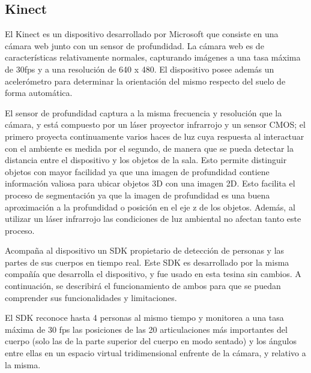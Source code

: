 
\subsection{Kinect}

El Kinect es un dispositivo desarrollado por Microsoft que consiste en una cámara web junto con un sensor de profundidad. La cámara web es de características relativamente normales, capturando imágenes a una tasa máxima de 30fps y a una resolución de 640 x 480. El dispositivo posee además un acelerómetro para determinar la orientación del mismo respecto del suelo de forma automática.


El sensor de profundidad captura a la misma frecuencia y resolución que la cámara, y está compuesto por un láser proyector infrarrojo y un sensor CMOS; el primero proyecta continuamente varios haces de luz cuya respuesta al interactuar con el ambiente es medida por el segundo, de manera que se pueda detectar la distancia entre el dispositivo y los objetos de la sala. Esto permite distinguir objetos con mayor facilidad ya que una imagen de profundidad contiene información valiosa para ubicar objetos 3D con una imagen 2D. Esto facilita el proceso de segmentación ya que la imagen de profundidad es una buena aproximación a la profundidad o posición en el eje z de los objetos. Además, al utilizar un láser infrarrojo las condiciones de luz ambiental no afectan tanto este proceso. 



Acompaña al dispositivo un SDK propietario de detección de personas y las partes de sus cuerpos en tiempo real. Este SDK es desarrollado por la misma compañía que desarrolla el dispositivo, y fue usado en esta tesina sin cambios. A continuación, se describirá el funcionamiento de ambos para que se puedan comprender sus funcionalidades y limitaciones.


El SDK reconoce hasta 4 personas al mismo tiempo y monitorea a una tasa máxima de 30 fps las posiciones de las 20 articulaciones más importantes del cuerpo (solo las de la parte superior del cuerpo en modo sentado) y los ángulos entre ellas en un espacio virtual tridimensional enfrente de la cámara, y relativo a la misma.

